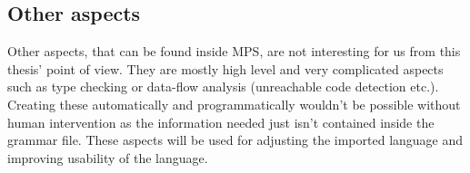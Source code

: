 \subsection{Other aspects}
Other aspects, that can be found inside MPS, are not interesting for us from this thesis' point of view. They are mostly high level and very complicated aspects such as type checking or data-flow analysis (unreachable code detection etc.). Creating these automatically and programmatically wouldn't be possible without human intervention as the information needed just isn't contained inside the grammar file. These aspects will be used for adjusting the imported language and improving usability of the language.